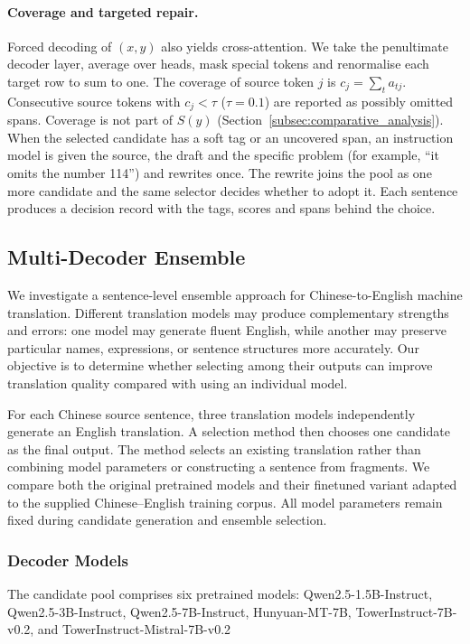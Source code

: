 \documentclass[11pt]{article}
\begin{document}
\paragraph{Coverage and targeted repair.}
Forced decoding of $(x,y)$ also yields cross-attention. We take the penultimate decoder layer, average over heads, mask special tokens and renormalise each target row to sum to one. The coverage of source token $j$ is $c_j=\sum_t a_{tj}$. Consecutive source tokens with $c_j<\tau$ ($\tau=0.1$) are reported as possibly omitted spans. Coverage is not part of $S(y)$ (Section~\ref{subsec:comparative_analysis}). When the selected candidate has a soft tag or an uncovered span, an instruction model is given the source, the draft and the specific problem (for example, ``it omits the number 114'') and rewrites once. The rewrite joins the pool as one more candidate and the same selector decides whether to adopt it. Each sentence produces a decision record with the tags, scores and spans behind the choice.

\subsection{Multi-Decoder Ensemble}
\label{subsec:ensemble}
We investigate a sentence-level ensemble approach for Chinese-to-English machine translation. Different translation models may produce complementary strengths and errors: one model may generate fluent English, while another may preserve particular names, expressions, or sentence structures more accurately. Our objective is to determine whether selecting among their outputs can improve translation quality compared with using an individual model.

For each Chinese source sentence, three translation models independently generate an English translation. A selection method then chooses one candidate as the final output. The method selects an existing translation rather than combining model parameters or constructing a sentence from fragments. We compare both the original pretrained models and their finetuned variant adapted to the supplied Chinese--English training corpus. All model parameters remain fixed during candidate generation and ensemble selection.

\subsubsection{Decoder Models}
\label{subsubsec:decoder_models}

The candidate pool comprises six pretrained models: Qwen2.5-1.5B-Instruct, Qwen2.5-3B-Instruct, Qwen2.5-7B-Instruct, Hunyuan-MT-7B, TowerInstruct-7B-v0.2, and TowerInstruct-Mistral-7B-v0.2
\end{document}
